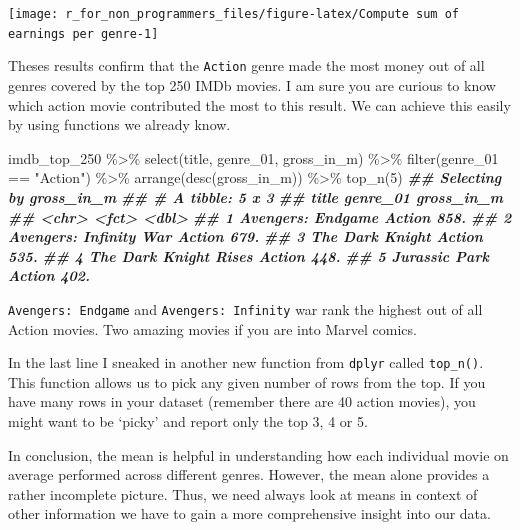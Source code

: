 \documentclass[
]{book}
\newenvironment{Shaded}{\begin{snugshade}}{\end{snugshade}}
\newcommand{\DecValTok}[1]{\textcolor[rgb]{0.00,0.00,0.81}{#1}}
\newcommand{\DocumentationTok}[1]{\textcolor[rgb]{0.56,0.35,0.01}{\textbf{\textit{#1}}}}
\newcommand{\FunctionTok}[1]{\textcolor[rgb]{0.00,0.00,0.00}{#1}}
\newcommand{\NormalTok}[1]{#1}
\newcommand{\SpecialCharTok}[1]{\textcolor[rgb]{0.00,0.00,0.00}{#1}}
\newcommand{\StringTok}[1]{\textcolor[rgb]{0.31,0.60,0.02}{#1}}
\begin{document}
\begin{center}\texttt{[image: r\_for\_non\_programmers\_files/figure-latex/Compute sum of earnings per genre-1]} \end{center}

Theses results confirm that the \texttt{Action} genre made the most money out of all genres covered by the top 250 IMDb movies. I am sure you are curious to know which action movie contributed the most to this result. We can achieve this easily by using functions we already know.

\begin{Shaded}
\begin{Highlighting}[]
\NormalTok{imdb\_top\_250 }\SpecialCharTok{\%\textgreater{}\%} 
  \FunctionTok{select}\NormalTok{(title, genre\_01, gross\_in\_m) }\SpecialCharTok{\%\textgreater{}\%} 
  \FunctionTok{filter}\NormalTok{(genre\_01 }\SpecialCharTok{==} \StringTok{"Action"}\NormalTok{) }\SpecialCharTok{\%\textgreater{}\%} 
  \FunctionTok{arrange}\NormalTok{(}\FunctionTok{desc}\NormalTok{(gross\_in\_m)) }\SpecialCharTok{\%\textgreater{}\%} 
  \FunctionTok{top\_n}\NormalTok{(}\DecValTok{5}\NormalTok{)}
\DocumentationTok{\#\# Selecting by gross\_in\_m}
\DocumentationTok{\#\# \# A tibble: 5 x 3}
\DocumentationTok{\#\#   title                  genre\_01 gross\_in\_m}
\DocumentationTok{\#\#   \textless{}chr\textgreater{}                  \textless{}fct\textgreater{}         \textless{}dbl\textgreater{}}
\DocumentationTok{\#\# 1 Avengers: Endgame      Action         858.}
\DocumentationTok{\#\# 2 Avengers: Infinity War Action         679.}
\DocumentationTok{\#\# 3 The Dark Knight        Action         535.}
\DocumentationTok{\#\# 4 The Dark Knight Rises  Action         448.}
\DocumentationTok{\#\# 5 Jurassic Park          Action         402.}
\end{Highlighting}
\end{Shaded}

\texttt{Avengers:\ Endgame} and \texttt{Avengers:\ Infinity} war rank the highest out of all Action movies. Two amazing movies if you are into Marvel comics.

In the last line I sneaked in another new function from \texttt{dplyr} called \texttt{top\_n()}. This function allows us to pick any given number of rows from the top. If you have many rows in your dataset (remember there are 40 action movies), you might want to be `picky' and report only the top 3, 4 or 5.

In conclusion, the mean is helpful in understanding how each individual movie on average performed across different genres. However, the mean alone provides a rather incomplete picture. Thus, we need always look at means in context of other information we have to gain a more comprehensive insight into our data.
\end{document}
